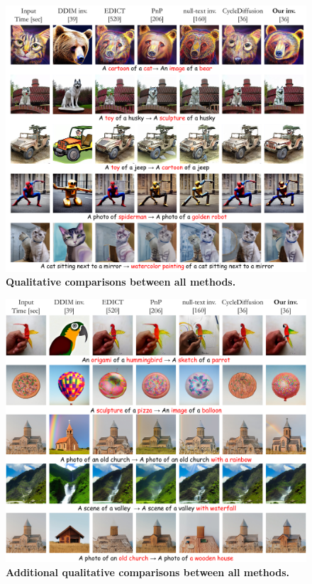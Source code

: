 \begin{figure}[h]
\includegraphics[width=\textwidth]{ICCV23_submission/figures/comparison_SM_1.pdf}
\caption{\textbf{Qualitative comparisons between all methods.}}
\label{fig:comparisons_SM_1}
\end{figure}

\clearpage

\begin{figure}[h]
\includegraphics[width=\textwidth]{ICCV23_submission/figures/comparison_SM_2.pdf}
\caption{\textbf{Additional qualitative comparisons between all methods.}}
\label{fig:comparisons_SM_2}
\end{figure}

\clearpage



